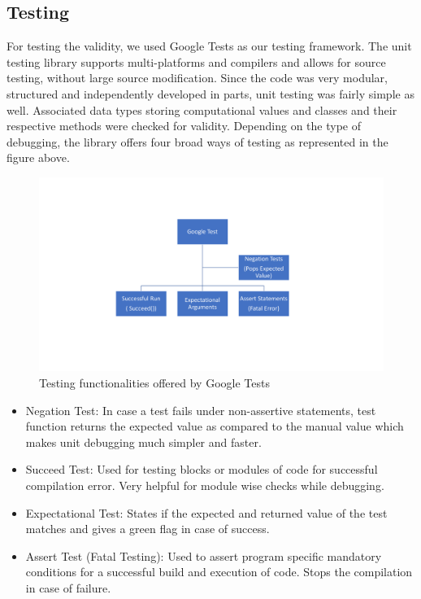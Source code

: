 \documentclass[11pt]{scrartcl}
\begin{document}
\newpage 
\subsection{Testing}
For testing the validity, we used Google Tests as our testing framework. The unit testing library supports multi-platforms and compilers and allows for source testing, without large source modification. Since the code was very modular, structured and independently developed in parts, unit testing was fairly simple as well. Associated data types storing computational values and classes and their respective methods were checked for validity. 
Depending on the type of debugging, the library offers four broad ways of testing as represented in the figure above.

\begin{figure}
	\centering
	\includegraphics[width=.9\textwidth]{figs/Test.pdf}
	\caption{Testing functionalities offered by Google Tests}\label{fig:Google Test}
\end{figure}
\begin{itemize}
  \item Negation Test: In case a test fails under non-assertive statements, test function returns the expected value as compared to the manual value which makes unit debugging much simpler and faster.
  \item Succeed Test: Used for testing blocks or modules of code for successful compilation error. Very helpful for module wise checks while debugging.
 \item Expectational Test: States if the expected and returned value of the test matches and gives a green flag in case of success.
 \item Assert Test (Fatal Testing): Used to assert program specific mandatory conditions for a successful build and execution of code. Stops the compilation in case of failure.
\end{itemize}
\end{document}
